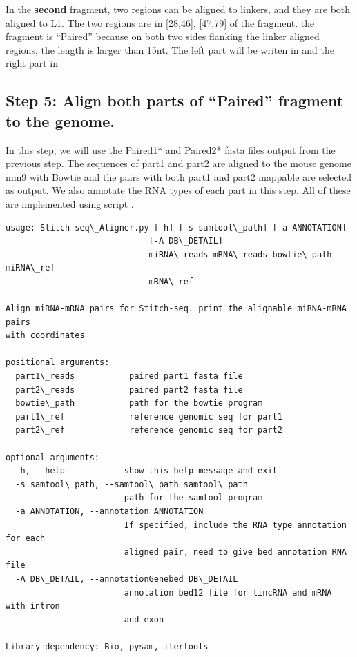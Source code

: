 \documentclass[letterpaper,10pt,english]{sphinxmanual}
\begin{document}
In the \textbf{second} fragment, two regions can be aligned to linkers, and they are both aligned to L1. The two regions are in {[}28,46{]}, {[}47,79{]} of the fragment. the fragment is ``Paired'' because on both two sides flanking the linker aligned regions, the length is larger than 15nt. The left part will be writen in  and the right part in 


\subsection{Step 5: Align both parts of ``Paired'' fragment to the genome.}
\label{Analysis_pipeline:step-5-align-both-parts-of-paired-fragment-to-the-genome}\label{Analysis_pipeline:step5}
In this step, we will use the Paired1* and Paired2* fasta files output from the previous step. The sequences of part1 and part2 are aligned to the mouse genome mm9 with Bowtie and the pairs with both part1 and part2 mappable are selected as output. We also annotate the RNA types of each part in this step.
All of these are implemented using script .

\begin{Verbatim}[commandchars=\\\{\}]
usage: Stitch-seq\_Aligner.py [-h] [-s samtool\_path] [-a ANNOTATION]
                             [-A DB\_DETAIL]
                             miRNA\_reads mRNA\_reads bowtie\_path miRNA\_ref
                             mRNA\_ref

Align miRNA-mRNA pairs for Stitch-seq. print the alignable miRNA-mRNA pairs
with coordinates

positional arguments:
  part1\_reads           paired part1 fasta file
  part2\_reads           paired part2 fasta file
  bowtie\_path           path for the bowtie program
  part1\_ref             reference genomic seq for part1
  part2\_ref             reference genomic seq for part2

optional arguments:
  -h, --help            show this help message and exit
  -s samtool\_path, --samtool\_path samtool\_path
                        path for the samtool program
  -a ANNOTATION, --annotation ANNOTATION
                        If specified, include the RNA type annotation for each
                        aligned pair, need to give bed annotation RNA file
  -A DB\_DETAIL, --annotationGenebed DB\_DETAIL
                        annotation bed12 file for lincRNA and mRNA with intron
                        and exon

Library dependency: Bio, pysam, itertools
\end{Verbatim}
\end{document}
